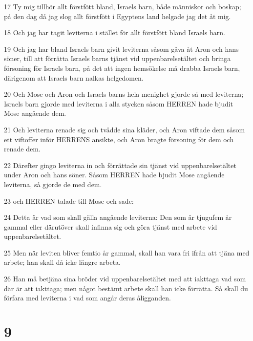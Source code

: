 \par 17 Ty mig tillhör allt förstfött bland, Israels barn, både människor och boskap; på den dag då jag slog allt förstfött i Egyptens land helgade jag det åt mig.
\par 18 Och jag har tagit leviterna i stället för allt förstfött bland Israels barn.
\par 19 Och jag har bland Israels barn givit leviterna såsom gåva åt Aron och hans söner, till att förrätta Israels barns tjänst vid uppenbarelsetältet och bringa försoning för Israels barn, på det att ingen hemsökelse må drabba Israels barn, därigenom att Israels barn nalkas helgedomen.
\par 20 Och Mose och Aron och Israels barns hela menighet gjorde så med leviterna; Israels barn gjorde med leviterna i alla stycken såsom HERREN hade bjudit Mose angående dem.
\par 21 Och leviterna renade sig och tvådde sina kläder, och Aron viftade dem såsom ett viftoffer inför HERRENS ansikte, och Aron bragte försoning för dem och renade dem.
\par 22 Därefter gingo leviterna in och förrättade sin tjänst vid uppenbarelsetältet under Aron och hans söner. Såsom HERREN hade bjudit Mose angående leviterna, så gjorde de med dem.
\par 23 och HERREN talade till Mose och sade:
\par 24 Detta är vad som skall gälla angående leviterna: Den som är tjugufem år gammal eller därutöver skall infinna sig och göra tjänst med arbete vid uppenbarelsetältet.
\par 25 Men när leviten bliver femtio år gammal, skall han vara fri ifrån att tjäna med arbete; han skall då icke längre arbeta.
\par 26 Han må betjäna sina bröder vid uppenbarelsetältet med att iakttaga vad som där är att iakttaga; men något bestämt arbete skall han icke förrätta. Så skall du förfara med leviterna i vad som angår deras åligganden.

\chapter{9}

